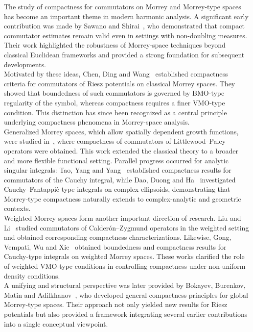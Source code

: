 \documentclass[11pt,a4]{article}
\numberwithin{equation}{section}
\theoremstyle{definition}
\theoremstyle{remark}
\begin{document}
The study of compactness for commutators on Morrey and Morrey-type spaces has become an important theme in modern harmonic analysis. A significant early contribution was made by Sawano and Shirai~\cite{mlc-cpt}, who demonstrated that compact commutator estimates remain valid even in settings with non-doubling measures. Their work highlighted the robustness of Morrey-space techniques beyond classical Euclidean frameworks and provided a strong foundation for subsequent developments.\\
Motivated by these ideas, Chen, Ding and Wang~\cite{CDW09} established compactness criteria for commutators of Riesz potentials on classical Morrey spaces. They showed that boundedness of such commutators is governed by BMO-type regularity of the symbol, whereas compactness requires a finer VMO-type condition. This distinction has since been recognized as a central principle underlying compactness phenomena in Morrey-space analysis.\\
Generalized Morrey spaces, which allow spatially dependent growth functions, were studied in~\cite{CDW10}, where compactness of commutators of Littlewood--Paley operators were obtained. This work extended the classical theory to a broader and more flexible functional setting. Parallel progress occurred for analytic singular integrals: Tao, Yang and Yang~\cite{TYY19} established compactness results for commutators of the Cauchy integral, while Dao, Duong and Ha~\cite{DDH21} investigated Cauchy--Fantappi\`e type integrals on complex ellipsoids, demonstrating that Morrey-type compactness naturally extends to complex-analytic and geometric contexts.\\
Weighted Morrey spaces form another important direction of research. Liu and Li~\cite{JL} studied commutators of Calderón--Zygmund operators in the weighted setting and obtained corresponding compactness characterizations. Likewise, Gong, Vempati, Wu and Xie~\cite{GVW22} obtained boundedness and compactness results for Cauchy-type integrals on weighted Morrey spaces. These works clarified the role of weighted VMO-type conditions in controlling compactness under non-uniform density conditions.\\
A unifying and structural perspective was later provided by Bokayev, Burenkov, Matin and Adilkhanov~\cite{B24}, who developed general compactness principles for global Morrey-type spaces. Their approach not only yielded new results for Riesz potentials but also provided a framework integrating several earlier contributions into a single conceptual viewpoint.
\end{document}
